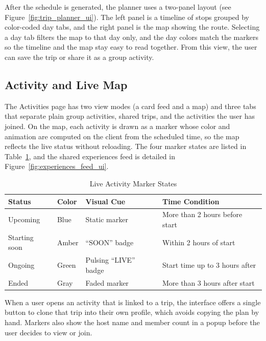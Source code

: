 \documentclass[a4paper,12pt]{report}
\begin{document}
After the schedule is generated, the planner uses a two-panel layout (see Figure~\ref{fig:trip_planner_ui}). The left panel is a timeline of stops grouped by color-coded day tabs, and the right panel is the map showing the route. Selecting a day tab filters the map to that day only, and the day colors match the markers so the timeline and the map stay easy to read together. From this view, the user can save the trip or share it as a group activity.

\subsection{Activity and Live Map}

The Activities page has two view modes (a card feed and a map) and three tabs that separate plain group activities, shared trips, and the activities the user has joined. On the map, each activity is drawn as a marker whose color and animation are computed on the client from the scheduled time, so the map reflects the live status without reloading. The four marker states are listed in Table~\ref{tab:marker_states}, and the shared experiences feed is detailed in Figure~\ref{fig:experiences_feed_ui}.

\begin{table}[H]
\centering
\small
\renewcommand{\arraystretch}{1.2}
\begin{tabular}{|p{2.8cm}|p{2.5cm}|p{3.5cm}|p{3.7cm}|}
\hline
\textbf{Status} & \textbf{Color} & \textbf{Visual Cue} & \textbf{Time Condition} \\ \hline
Upcoming & Blue & Static marker & More than 2 hours before start \\ \hline
Starting soon & Amber & ``SOON'' badge & Within 2 hours of start \\ \hline
Ongoing & Green & Pulsing ``LIVE'' badge & Start time up to 3 hours after \\ \hline
Ended & Gray & Faded marker & More than 3 hours after start \\ \hline
\end{tabular}
\caption{Live Activity Marker States}
\label{tab:marker_states}
\end{table}

When a user opens an activity that is linked to a trip, the interface offers a single button to clone that trip into their own profile, which avoids copying the plan by hand. Markers also show the host name and member count in a popup before the user decides to view or join.
\end{document}
